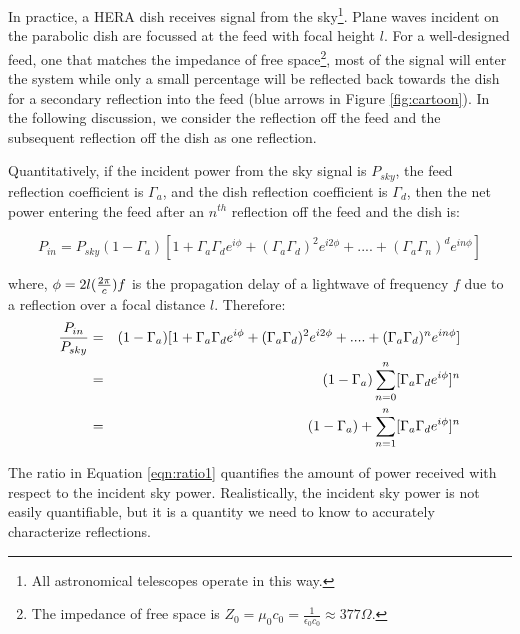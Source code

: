 \documentclass[12pt,preprint]{aastex}
\begin{document}
In practice, a HERA dish receives signal from the sky\footnote{All astronomical
telescopes operate in this way.}. Plane waves incident on the parabolic dish
are focussed at the feed with focal height $l$. For a well-designed feed, one
that matches the impedance of free space\footnote{The impedance of free space
is $Z_{0} = \mu_{0}c_{0} = \frac{1}{\epsilon_{0}c_{0}} \approx 377\Omega $.},
most of the signal will enter the system while only
a small percentage will be reflected back towards the dish for a secondary
reflection into the feed (blue arrows in Figure \ref{fig:cartoon}). In the
following discussion, we consider the reflection off the feed and the
subsequent reflection off the dish as one reflection.

Quantitatively, if the incident power from the sky signal is $P_{sky}$, the feed
reflection coefficient is $\Gamma_{a}$, and the dish reflection
coefficient is $\Gamma_{d}$, then the net power entering the feed after an
$n^{th}$ reflection off the feed and the dish is:

\begin{equation}\label{eqn:series1}
P_{in} =  P_{sky}(1-\Gamma_{a})[1+ \Gamma_{a}\Gamma_{d} e^{i\phi}+ (\Gamma_{a}\Gamma_{d})^2e^{i2\phi}+ ....+ (\Gamma_{a}\Gamma_{n})^{d}e^{in\phi}]
\end{equation}

where, $\phi = 2l({2\pi \over c})f$ is the propagation delay of a lightwave of frequency $f$ due to a reflection over a focal distance $l$. 
Therefore:
\begin{eqnarray}\label{eqn:ratio1}
{P_{in} \over P_{sky} } & = & (1-\Gamma_{a})[1+ \Gamma_{a}\Gamma_{d} e^{i\phi}+ (\Gamma_{a}\Gamma_{d})^2e^{i2\phi}+ ....+ (\Gamma_{a}\Gamma_{d})^{n}e^{in\phi}] \nonumber\\
      & = & (1-\Gamma_{a}) \displaystyle\sum\limits_{n=0}^{n} [\Gamma_{a}\Gamma_{d}e^{i \phi}]^{n}\nonumber\\
      & = & (1-\Gamma_{a})+ \displaystyle\sum\limits_{n=1}^{n} [\Gamma_{a}\Gamma_{d}e^{i \phi}]^{n}
\end{eqnarray}

The ratio in Equation \ref{eqn:ratio1} quantifies the amount of power received
with respect to the incident sky power. Realistically, the incident sky power
is not easily quantifiable, but it is a quantity we need to know to accurately
characterize reflections.  


 
\end{document}
